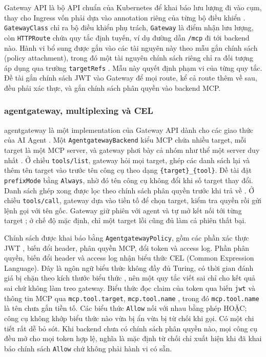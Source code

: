 \documentclass[a4paper]{article}
\begin{document}
Gateway API là bộ API chuẩn của Kubernetes để khai báo lưu lượng đi vào cụm, thay cho Ingress vốn phải dựa vào annotation riêng của từng bộ điều khiển \parencite{gatewayapi,k8s_ingress}. \texttt{GatewayClass} chỉ ra bộ điều khiển phụ trách, \texttt{Gateway} là điểm nhận lưu lượng, còn \texttt{HTTPRoute} chứa quy tắc định tuyến, ví dụ đường dẫn \texttt{/mcp} đi tới backend nào. Hành vi bổ sung được gắn vào các tài nguyên này theo mẫu gắn chính sách (policy attachment), trong đó một tài nguyên chính sách riêng chỉ ra đối tượng áp dụng qua trường \texttt{targetRefs} \parencite{gep713}. Mẫu này quyết định phạm vi của từng quy tắc. Đề tài gắn chính sách JWT vào Gateway để mọi route, kể cả route thêm về sau, đều phải xác thực, và gắn chính sách phân quyền vào backend MCP.

\subsubsection{agentgateway, multiplexing và CEL}

agentgateway là một implementation của Gateway API dành cho các giao thức của AI Agent \parencite{agentgateway}. Một \texttt{AgentgatewayBackend} kiểu MCP chứa nhiều target, mỗi target là một MCP server, và gateway phơi bày cả nhóm như thể một server duy nhất \parencite{agw_virtual}. Ở chiều \texttt{tools/list}, gateway hỏi mọi target, ghép các danh sách lại và thêm tên target vào trước tên công cụ theo dạng \texttt{\{target\}\_\{tool\}}. Đề tài đặt \texttt{prefixMode} bằng \texttt{Always}, nhờ đó tên công cụ không đổi khi số target thay đổi. Danh sách ghép xong được lọc theo chính sách phân quyền trước khi trả về \parencite{agw_toolaccess}. Ở chiều \texttt{tools/call}, gateway dựa vào tiền tố để chọn target, kiểm tra quyền rồi gửi lệnh gọi với tên gốc. Gateway giữ phiên với agent và tự mở kết nối tới từng target \parencite{agw_session}; ở chế độ mặc định, chỉ một target lỗi cũng đủ làm cả phiên thất bại.

Chính sách được khai báo bằng \texttt{AgentgatewayPolicy}, gồm các phần xác thực JWT \parencite{agw_jwt}, biến đổi header, phân quyền MCP, đổi token \parencite{agw_tokenexchange} và access log. Phần phân quyền, biến đổi header và access log nhận biểu thức CEL (Common Expression Language). Đây là ngôn ngữ biểu thức không đầy đủ Turing, có thời gian đánh giá bị chặn theo kích thước biểu thức \parencite{cel_spec}, nên một quy tắc viết sai chỉ cho kết quả sai chứ không làm treo gateway. Biểu thức đọc claim của token qua biến \texttt{jwt} và thông tin MCP qua \texttt{mcp.tool.target}, \texttt{mcp.tool.name} \parencite{agw_cel}, trong đó \texttt{mcp.tool.name} là tên chưa gắn tiền tố. Các biểu thức \texttt{Allow} nối với nhau bằng phép HOẶC; công cụ không khớp biểu thức nào vừa bị ẩn vừa bị từ chối khi gọi. Có một chi tiết rất dễ bỏ sót. Khi backend chưa có chính sách phân quyền nào, mọi công cụ đều mở cho mọi token hợp lệ, nghĩa là mặc định từ chối chỉ xuất hiện khi đã khai báo chính sách \texttt{Allow} chứ không phải hành vi có sẵn.
\end{document}
